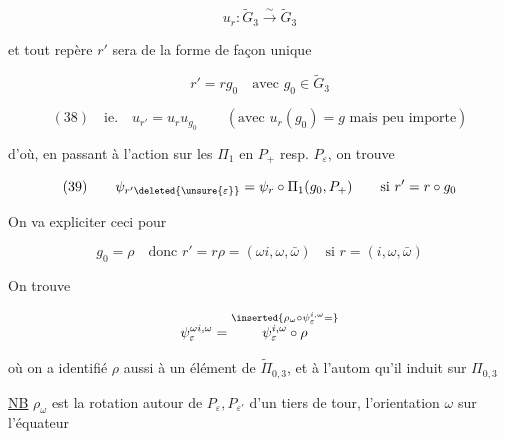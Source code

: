 
\[u_r:\widetilde G_3\xrightarrow{\sim}\widetilde G_3\]

et tout repère $r'$  sera de la forme de façon unique

\[r'=rg_0\quad\text{avec }g_0\in\widetilde G_3\]

\[(38)\quad\text{ie.}\quad u_{r'}=u_ru_{g_0}\qquad(\text{avec }u_r(g_0)=g\text{ mais peu importe})\]

d'où, en passant à l'action sur les $\Pi_1$ en $P_+$ resp. $P_\varepsilon$, on trouve

\[(39)\qquad\psi_{r'\deleted{\unsure{\varepsilon}}}=\psi_r\circ\Pi_1(g_0,P_+)\qquad\text{si }r'=r\circ g_0\]


On va expliciter ceci pour

\[g_0=\rho\quad\text{donc }r'=r\rho=(\omega i,\omega,\bar\omega)\quad\text{si }r=(i,\omega,\bar\omega)\]

On trouve

\[\psi_\varepsilon^{\omega i,\omega}=\overset{\inserted{\rho_\omega\circ\psi_\varepsilon^{i,\omega}=}}{\psi_\varepsilon^{i,\omega}\circ\rho}\]

où on a identifié $\rho$ aussi à un élément de $\widetilde\Pi_{0,3}$, et à l'autom qu'il induit sur $\Pi_{0,3}$

\uline{NB} $\rho_\omega$ est la rotation autour de $P_\varepsilon,P_{\varepsilon'}$ d'un tiers de tour,  l'orientation $\omega$ sur l'équateur


